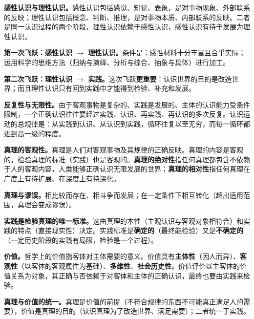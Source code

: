 \documentclass[11pt]{ctexart}
\newcommand{\dw}[1]{\textbf{\color{violetdeep}#1}}   %
\let\origsubhdr\subhdr
\renewcommand{\subhdr}[1]{\par\needspace{4\baselineskip}\origsubhdr{#1}}
\begin{document}

\textbf{感性认识与理性认识。}感性认识包括感觉、知觉、表象，是对事物现象、外部联系的反映；理性认识包括概念、判断、推理，是对事物本质、内部联系的反映。二者是同一认识过程的两个阶段，理性认识依赖于感性认识，感性认识有待于发展为理性认识。

\textbf{第一次飞跃：感性认识 $\rightarrow$ 理性认识。}条件是：感性材料十分丰富且合乎实际；运用科学的思维方法（归纳与演绎、分析与综合、抽象与具体）进行加工。

\textbf{第二次飞跃：理性认识 $\rightarrow$ 实践。}这次飞跃\dw{更重要}：认识世界的目的是改造世界；而且理性认识只有回到实践中才能得到检验、补充和发展。

\textbf{反复性与无限性。}由于客观事物是复杂的、实践是发展的、主体的认识能力受条件限制，一个正确认识往往要经过实践、认识、再实践、再认识的多次反复。认识运动的总规律是：从实践到认识、从认识到实践，循环往复以至无穷，而每一循环都进到高一级的程度。


\textbf{真理的客观性。}真理是人们对客观事物及其规律的正确反映。真理的内容是客观的，检验真理的标准（实践）也是客观的。\dw{真理的绝对性}指任何真理都包含不依赖于人的客观内容，人类能够正确认识无限发展的世界；\dw{真理的相对性}指任何真理在广度上有待扩展、在深度上有待深化。

\textbf{真理与谬误。}相比较而存在、相斗争而发展；在一定条件下相互转化（超出适用范围，真理会变成谬误）。

\textbf{实践是检验真理的唯一标准。}这由真理的本性（主观认识与客观对象相符合）和实践的特点（直接现实性）决定。实践标准是\dw{确定的}（最终能检验）又是\dw{不确定的}（一定历史阶段的实践有局限，检验是一个过程）。

\textbf{价值。}哲学上的价值指客体对主体需要的意义。价值具有\dw{主体性}（因人而异）、\dw{客观性}（以客体的客观属性为基础）、\dw{多维性}、\dw{社会历史性}。价值评价以主客体的价值关系为对象，其正确与否依赖于对客体和主体的正确认识，最终也要由实践来检验。

\textbf{真理与价值的统一。}真理是价值的前提（不符合规律的东西不可能真正满足人的需要），价值是真理的目的（认识真理为了改造世界、满足需要）；二者统一于实践。

\end{document}
